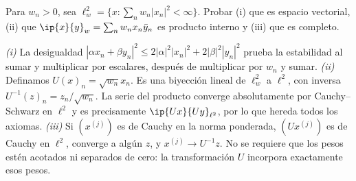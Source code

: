 \begin{ejercicio}
Para $w_n>0$, sea $\ell^{2}_w=\{x:\sum_n w_n|x_n|^{2}<\infty\}$. Probar (i) que es espacio vectorial, (ii) que $\ip{x}{y}_w=\sum_nw_nx_n\bar y_n$ es producto interno y (iii) que es completo.
\end{ejercicio}
\begin{solucion}
\emph{(i)} La desigualdad $|\alpha x_n+\beta y_n|^{2}\leq2|\alpha|^{2}|x_n|^{2}+2|\beta|^{2}|y_n|^{2}$ prueba la estabilidad al sumar y multiplicar por escalares, después de multiplicar por $w_n$ y sumar.
\emph{(ii)} Definamos $U(x)_n=\sqrt{w_n}x_n$. Es una biyección lineal de $\ell^{2}_w$ a $\ell^{2}$, con inversa $U^{-1}(z)_n=z_n/\sqrt{w_n}$. La serie del producto converge absolutamente por Cauchy--Schwarz en $\ell^{2}$ y es precisamente $\ip{Ux}{Uy}_{\ell^{2}}$, por lo que hereda todos los axiomas.
\emph{(iii)} Si $(x^{(j)})$ es de Cauchy en la norma ponderada, $(Ux^{(j)})$ es de Cauchy en $\ell^{2}$, converge a algún $z$, y $x^{(j)}\to U^{-1}z$. No se requiere que los pesos estén acotados ni separados de cero: la transformación $U$ incorpora exactamente esos pesos.
\end{solucion}

